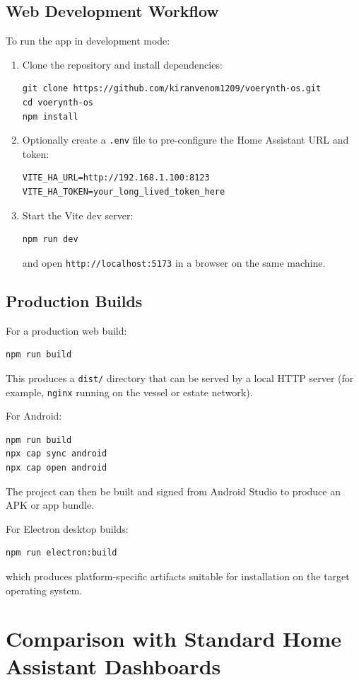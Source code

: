 \documentclass[11pt,a4paper]{article}
\begin{document}
\subsection{Web Development Workflow}

To run the app in development mode:
\begin{enumerate}[leftmargin=*]
  \item Clone the repository and install dependencies:
  \begin{verbatim}
git clone https://github.com/kiranvenom1209/voerynth-os.git
cd voerynth-os
npm install
  \end{verbatim}
  \item Optionally create a \texttt{.env} file to pre-configure the Home Assistant URL and token:
  \begin{verbatim}
VITE_HA_URL=http://192.168.1.100:8123
VITE_HA_TOKEN=your_long_lived_token_here
  \end{verbatim}
  \item Start the Vite dev server:
  \begin{verbatim}
npm run dev
  \end{verbatim}
  and open \texttt{http://localhost:5173} in a browser on the same machine.
\end{enumerate}

\subsection{Production Builds}

For a production web build:
\begin{verbatim}
npm run build
  \end{verbatim}
This produces a \texttt{dist/} directory that can be served by a local HTTP server (for example, \texttt{nginx} running on the vessel or estate network).

For Android:
\begin{verbatim}
npm run build
npx cap sync android
npx cap open android
  \end{verbatim}
The project can then be built and signed from Android Studio to produce an APK or app bundle.

For Electron desktop builds:
\begin{verbatim}
npm run electron:build
  \end{verbatim}
which produces platform-specific artifacts suitable for installation on the target operating system.

\section{Comparison with Standard Home Assistant Dashboards}
\end{document}
